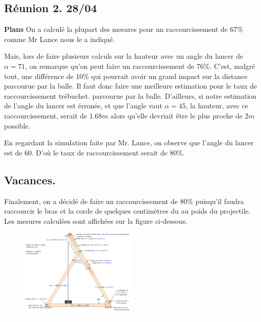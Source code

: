 \documentclass[10pt]{article}
\begin{document}
\vspace{1cm}
\subsection{Réunion 2. 28/04}

{\bf Plans}
On a calculé la plupart des mesures pour un raccourcissement de 67\% comme Mr Lance nous le a indiqué.

Mais, lors de faire plusieurs calculs sur la hauteur avec un angle du lancer de $\alpha = 71$\textdegree, on remarque qu'on peut faire
un raccourcissement de 76\%. C'est, malgré tout, une différence de 10\% qui pourrait avoir un grand impact sur la distance
parcourue par la balle. Il faut donc faire une meilleure estimation pour le taux de raccourcissement trébuchet.
parcourue par la balle. D'ailleurs, si notre estimation de l'angle du lancer est érronée, et que l'angle vaut $\alpha = 45$\textdegree, la
hauteur, avec ce raccourcissement, serait de $1.68m$ alors qu'elle devriait être le plus proche de $2m$ possible.

En regardant la simulation faite par Mr. Lance, on observe que l'angle
du lancer est de $60$\textdegree. D'où le taux de raccourcissement serait
de 80\%.

\vspace{1cm}

\pagebreak

\subsection{Vacances.}

Finalement, on a décidé de faire un raccourcissement de 80\% puisqu'il faudra raccourcir le bras et la corde de quelques centimètres du au poids du projectile. Les mesures calculées sont affichées sur la figure ci-dessous. 

\begin{figure}[h]
\centering
\includegraphics[width=0.5\textwidth]{medidas2.png}
\end{figure}
\end{document}
